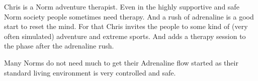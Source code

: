 \begin{npcBox}[title=Chris - a Norm adventure therapist]
    \begin{stunts}
    \item {}
    \item {}
    \item {}
    \end{stunts}

    \begin{stressSection}
    \end{stressSection}
    \begin{tabularx}{\textwidth}{ XX }
    \end{tabularx}

    \begin{consequences}
    \item {}
    \item {}
    \item {}
    \end{consequences}

    \begin{npcDescription}
    Chris is a Norm adventure therapist. Even in the highly supportive and safe Norm society people sometimes need therapy. And a rush of adrenaline is a good start to reset the mind.
    For that Chris invites the people to some kind of (very often simulated) adventure and extreme sports. And adds a therapy session to the phase after the adrenaline rush.

    Many Norms do not need much to get their Adrenaline flow started as their standard living environment is very controlled and safe.
    \end{npcDescription}

\end{npcBox}

\newpage

